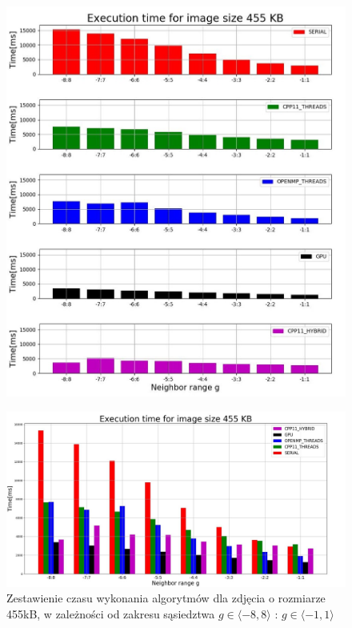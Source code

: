 \documentclass[document.tex]{subfiles}
\begin{document}
\clearpage
\begin{figure}[h]
\includegraphics[scale=0.6]{imgs/plot4_lap.jpg}
\caption*{}
\label{fig:results_lap_hybrid}
\end{figure}
\clearpage
\begin{figure}[h]
\includegraphics[scale=0.35]{imgs/plot2_lap.jpg}
\caption{Zestawienie czasu wykonania algorytmów dla zdjęcia o rozmiarze 455kB, 
        w zależności od zakresu sąsiedztwa $g\in \langle -8, 8 \rangle$ : $g\in \langle -1, 1 \rangle$ }
\label{fig:results_lap_hybrid}
\end{figure}
\end{document}
